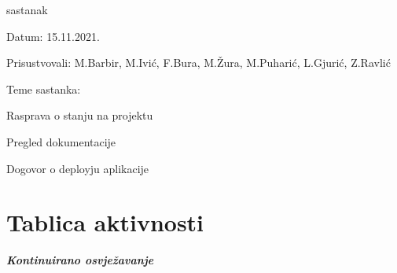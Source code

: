 \begin{packed_enum}
			\item  sastanak
			\item[] \begin{packed_item}
				\item Datum: 15.11.2021.
				\item Prisustvovali: M.Barbir, M.Ivić, F.Bura, M.Žura, M.Puharić, L.Gjurić, Z.Ravlić
				\item Teme sastanka:
				\begin{packed_item}
					\item  Rasprava o stanju na projektu
					\item  Pregled dokumentacije
					\item  Dogovor o deployju aplikacije 
				\end{packed_item}
			\end{packed_item}
			
			
		\end{packed_enum}
		
		\eject
		\section*{Tablica aktivnosti}
		
			\textbf{\textit{Kontinuirano osvježavanje}}\\
			

